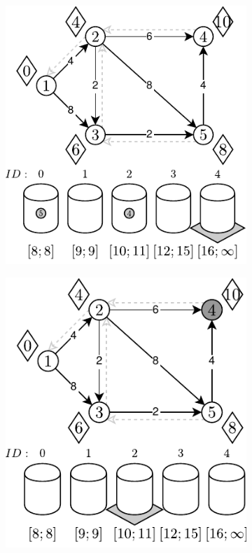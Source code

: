 \begin{figure}[!htbp]
\begin{subfigure}[b]{0.3\textwidth}
		\caption{}
	\end{subfigure}
	\begin{subfigure}[b]{0.3\textwidth}
		\includegraphics[width=\textwidth]{Chapter_II/RADIX-HEAP-C-Example/e.pdf}
		\caption{}
	\end{subfigure}
	\begin{subfigure}[b]{0.3\textwidth}
		\includegraphics[width=\textwidth]{Chapter_II/RADIX-HEAP-C-Example/f.pdf}

\end{subfigure}
\end{figure}
